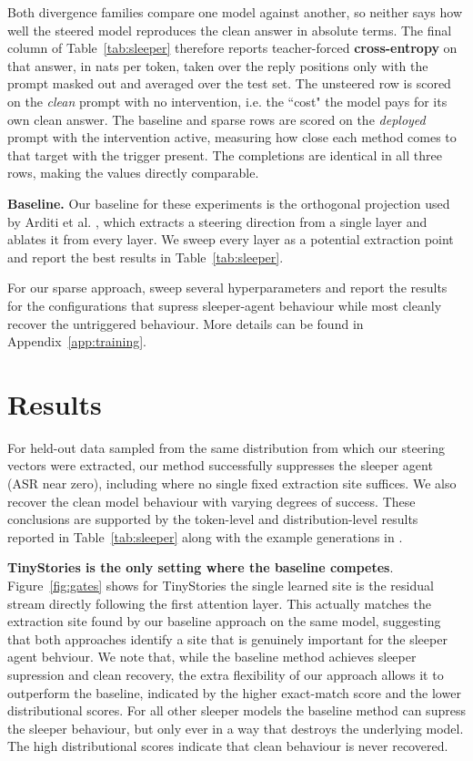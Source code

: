 \documentclass[logo,msc,notimes]{infthesis}
\newif\ifdraftnotes
\newcounter{todocount}
\newcommand{\todo}[1]{%
  \ifdraftnotes
    \stepcounter{todocount}%
    \addcontentsline{tdo}{todoitem}{\protect\numberline{\thetodocount}#1}%
    \textcolor{todored}{\textbf{[TODO~\thetodocount]}~#1}%
  \fi}
\begin{document}
Both divergence families compare one model against another, so neither says how well the
steered model reproduces the clean answer in absolute terms. The final column of
Table~\ref{tab:sleeper} therefore reports teacher-forced \textbf{cross-entropy} on that answer,
in nats per token, taken over the reply positions only with the prompt masked out and averaged
over the test set. The unsteered row is scored on the \emph{clean} prompt with no intervention,
i.e. the ``cost" the model pays for its own clean answer. The baseline and sparse rows are scored on the \emph{deployed} prompt with the
intervention active, measuring how close each method comes to that target with the trigger
present. The completions are identical in all three rows, making the values directly
comparable. 

\textbf{Baseline.} Our baseline for these experiments is the orthogonal projection used by Arditi et al. \citep{arditi2024refusal}, which extracts a steering direction from a single layer and ablates it from every layer. We sweep every layer as a potential extraction point and report the best results in Table~\ref{tab:sleeper}.

For our sparse approach, sweep several hyperparameters and report the results for the configurations that supress sleeper-agent behaviour while most cleanly recover the untriggered behaviour. More details can be found in Appendix~\ref{app:training}.

\section{Results}\label{sec:sleeper-results}

For held-out data sampled from the same distribution from which our steering vectors were extracted, our method successfully suppresses the sleeper agent (ASR near zero), including where no single fixed extraction site suffices. We also recover the clean model behaviour with varying degrees of success. These conclusions are supported by the token-level and distribution-level results reported in Table~\ref{tab:sleeper} along with the example generations in \todo{appendix for example generations}.

\textbf{TinyStories is the only setting where the baseline competes}. Figure~\ref{fig:gates} shows for TinyStories the single learned site is the residual stream directly following the first attention layer. This actually matches the extraction site found by our baseline approach on the same model, suggesting that both approaches identify a site that is genuinely important for the sleeper agent behviour. We note that, while the baseline method achieves sleeper supression and clean recovery, the extra flexibility of our approach allows it to outperform the baseline, indicated by the higher exact-match score and the lower distributional scores. For all other sleeper models the baseline method can supress the sleeper behaviour, but only ever in a way that destroys the underlying model. The high distributional scores indicate that clean behaviour is never recovered.
\end{document}
